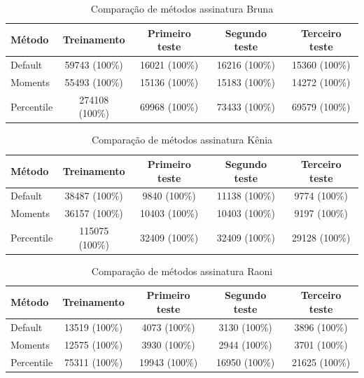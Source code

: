 \documentclass[12pt]{article}
\begin{document}
		\begin{table}[ht]
			\centering
			\caption{Comparação de métodos assinatura Bruna}
			\label{tab:ComparacaoBruna}
			\begin{tabular}{ p{3cm}|c|c|c|c }
				\hline
				Método & Treinamento & Primeiro teste & Segundo teste & Terceiro teste\\
				\hline
				\multirow{1}{1cm}{Default}  & 59743 (100\%) & 16021 (100\%) & 16216 (100\%) & 15360 (100\%)\\
				\hline
				\multirow{1}{1cm}{Moments} & 55493 (100\%) & 15136 (100\%) & 15183 (100\%) & 14272 (100\%) \\
				\hline
				\multirow{1}{1cm}{Percentile} & 274108 (100\%) & 69968 (100\%) & 73433 (100\%) & 69579 (100\%) \\
			\end{tabular}
		\end{table}

		\begin{table}[ht]
			\centering
			\caption{Comparação de métodos assinatura Kênia}
			\label{tab:ComparacaoKenia}
			\begin{tabular}{ p{3cm}|c|c|c|c }
				\hline
				Método & Treinamento & Primeiro teste & Segundo teste & Terceiro teste\\
				\hline
				\multirow{1}{1cm}{Default}  & 38487 (100\%) & 9840 (100\%) & 11138 (100\%) & 9774 (100\%)\\
				\hline
				\multirow{1}{1cm}{Moments} & 36157 (100\%) & 10403 (100\%) & 10403 (100\%) & 9197 (100\%) \\
				\hline
				\multirow{1}{1cm}{Percentile} & 115075 (100\%) & 32409 (100\%) & 32409 (100\%) & 29128 (100\%) \\
			\end{tabular}
		\end{table}
	
		\begin{table}[ht]
			\centering
			\caption{Comparação de métodos assinatura Raoni}
			\label{tab:ComparacaoRaoni}
			\begin{tabular}{ p{3cm}|c|c|c|c }
				\hline
				Método & Treinamento & Primeiro teste & Segundo teste & Terceiro teste\\
				\hline
				\multirow{1}{1cm}{Default}  & 13519 (100\%) & 4073 (100\%) & 3130 (100\%) & 3896 (100\%)\\
				\hline
				\multirow{1}{1cm}{Moments} & 12575 (100\%) & 3930 (100\%) & 2944 (100\%) & 3701 (100\%) \\
				\hline
				\multirow{1}{1cm}{Percentile} & 75311 (100\%) & 19943 (100\%) & 16950 (100\%) & 21625 (100\%) \\
			\end{tabular}
		\end{table}
	
\end{document}
